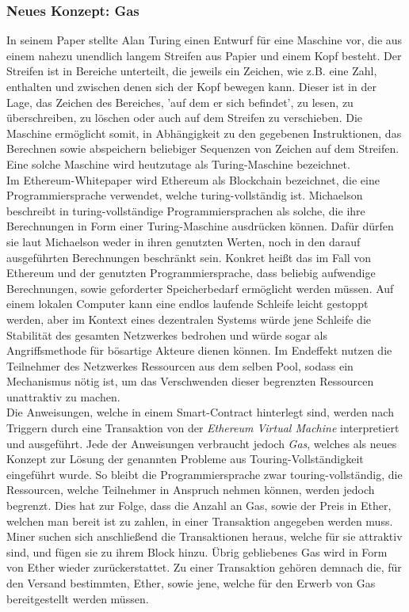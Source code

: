 \subsubsection{Neues Konzept: Gas}
In seinem Paper \cite{turing_1936} stellte Alan Turing einen Entwurf für eine Maschine vor, die aus einem nahezu unendlich langem Streifen aus Papier und einem Kopf besteht. Der Streifen ist in Bereiche unterteilt, die jeweils ein Zeichen, wie z.B. eine Zahl, enthalten und zwischen denen sich der Kopf bewegen kann. Dieser ist in der Lage, das Zeichen des Bereiches, 'auf dem er sich befindet', zu lesen, zu überschreiben, zu löschen oder auch auf dem Streifen zu verschieben. Die Maschine ermöglicht somit, in Abhängigkeit zu den gegebenen Instruktionen, das Berechnen sowie abspeichern beliebiger Sequenzen von Zeichen auf dem Streifen. Eine solche Maschine wird heutzutage als Turing-Maschine bezeichnet.\\
Im Ethereum-Whitepaper \cite{buterin_whitepaper_2013} wird Ethereum als Blockchain bezeichnet, die eine Programmiersprache verwendet, welche turing-vollständig ist. Michaelson beschreibt in \cite{Michaelson_2020} turing-vollständige Programmiersprachen als solche, die ihre Berechnungen in Form einer Turing-Maschine ausdrücken können. Dafür dürfen sie laut Michaelson weder in ihren genutzten Werten, noch in den darauf ausgeführten Berechnungen beschränkt sein. Konkret heißt das im Fall von Ethereum und der genutzten Programmiersprache, dass beliebig aufwendige Berechnungen, sowie geforderter Speicherbedarf ermöglicht werden müssen.
Auf einem lokalen Computer kann eine endlos laufende Schleife leicht gestoppt werden, aber im Kontext eines dezentralen Systems würde jene Schleife die Stabilität des gesamten Netzwerkes bedrohen und würde sogar als Angriffsmethode für bösartige Akteure dienen können. Im Endeffekt nutzen die Teilnehmer des Netzwerkes Ressourcen aus dem selben Pool, sodass ein Mechanismus nötig ist, um das Verschwenden dieser begrenzten Ressourcen unattraktiv zu machen.\\
Die Anweisungen, welche in einem Smart-Contract hinterlegt sind, werden nach Triggern durch eine Transaktion von der \emph{Ethereum Virtual Machine} interpretiert und ausgeführt. Jede der Anweisungen verbraucht jedoch \emph{Gas}, welches als neues Konzept zur Lösung der genannten Probleme aus Touring-Vollständigkeit eingeführt wurde. So bleibt die Programmiersprache zwar touring-vollständig, die Ressourcen, welche Teilnehmer in Anspruch nehmen können, werden jedoch begrenzt. Dies hat zur Folge, dass die Anzahl an Gas, sowie der Preis in Ether, welchen man bereit ist zu zahlen, in einer Transaktion angegeben werden muss. Miner suchen sich anschließend die Transaktionen heraus, welche für sie attraktiv sind, und fügen sie zu ihrem Block hinzu. Übrig gebliebenes Gas wird in Form von Ether wieder zurückerstattet. Zu einer Transaktion gehören demnach die, für den Versand bestimmten, Ether, sowie jene, welche für den Erwerb von Gas bereitgestellt werden müssen.
